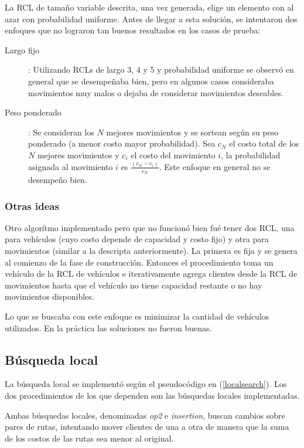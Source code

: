 \documentclass{article}
\begin{document}
  La RCL de tamaño variable descrita, una vez generada, elige un elemento con al azar con probabilidad uniforme. Antes de llegar a esta solución, se intentaron dos enfoques que no lograron tan buenos resultados en los casos de prueba:
  \begin{description}
    \item[Largo fijo]: Utilizando RCLs de largo 3, 4 y 5 y probabilidad uniforme se observó en general que se desempeñaba bien, pero en algunos casos consideraba movimientos muy malos o dejaba de considerar movimientos deseables.
    \item[Peso ponderado]: Se consideran los $N$ mejores movimientos y se sortean según su peso ponderado (a menor costo mayor probabilidad). Sea $c_N$ el costo total de los $N$ mejores movimientos y $c_i$ el costo del movimiento $i$, la probabilidad asignada al movimiento $i$ es $\frac{(c_N - c_i)}{c_N}$. Este enfoque en general no se desempeño bien.
  \end{description}

  \subsubsection*{Otras ideas}

  Otro algorítmo implementado pero que no funcionó bien fué tener dos RCL, una para vehículos (cuyo costo depende de capacidad y costo fijo) y otra para movimientos (similar a la descripta anteriormente).
  La primera es fija y se genera al comienzo de la fase de construcción. Entonces el procedimiento toma un vehículo de la RCL de vehículos e iterativamente agrega clientes desde la RCL de movimientos hasta que el vehículo no tiene capacidad restante o no hay movimientos disponibles.

  Lo que se buscaba con este enfoque es minimizar la cantidad de vehículos utilizados. En la práctica las soluciones no fueron buenas.

  \subsection*{Búsqueda local}

  La búsqueda local se implementó según el pseudocódigo en (\ref{localsearch}). Los dos procedimientos de los que dependen son las búsquedas locales implementadas.

  Ambas búsquedas locales, denominadas {\it op2} e {\it insertion}, buscan cambios sobre pares de rutas, intentando mover clientes de una a otra de manera que la suma de los costos de las rutas sea menor al original.
\end{document}
